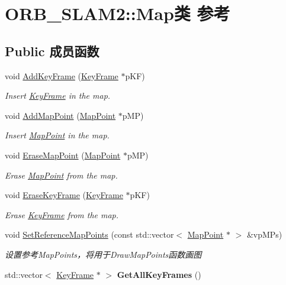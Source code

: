 \hypertarget{classORB__SLAM2_1_1Map}{\section{O\-R\-B\-\_\-\-S\-L\-A\-M2\-:\-:Map类 参考}
\label{classORB__SLAM2_1_1Map}
}
\subsection*{Public 成员函数}
\begin{DoxyCompactItemize}
\item 
void \hyperlink{classORB__SLAM2_1_1Map_a688de3b072e0176bb288bb70d36cd0e9}{Add\-Key\-Frame} (\hyperlink{classORB__SLAM2_1_1KeyFrame}{Key\-Frame} $\ast$p\-K\-F)
\begin{DoxyCompactList}\small\item\em Insert \hyperlink{classORB__SLAM2_1_1KeyFrame}{Key\-Frame} in the map. \end{DoxyCompactList}\item 
void \hyperlink{classORB__SLAM2_1_1Map_a2d8e1b4376778dfe32df90ec00b599e3}{Add\-Map\-Point} (\hyperlink{classORB__SLAM2_1_1MapPoint}{Map\-Point} $\ast$p\-M\-P)
\begin{DoxyCompactList}\small\item\em Insert \hyperlink{classORB__SLAM2_1_1MapPoint}{Map\-Point} in the map. \end{DoxyCompactList}\item 
void \hyperlink{classORB__SLAM2_1_1Map_af3c82d5e66815fe66cbfb736784f15b5}{Erase\-Map\-Point} (\hyperlink{classORB__SLAM2_1_1MapPoint}{Map\-Point} $\ast$p\-M\-P)
\begin{DoxyCompactList}\small\item\em Erase \hyperlink{classORB__SLAM2_1_1MapPoint}{Map\-Point} from the map. \end{DoxyCompactList}\item 
void \hyperlink{classORB__SLAM2_1_1Map_a082d4a5ec57a48a7591d6769e4778a80}{Erase\-Key\-Frame} (\hyperlink{classORB__SLAM2_1_1KeyFrame}{Key\-Frame} $\ast$p\-K\-F)
\begin{DoxyCompactList}\small\item\em Erase \hyperlink{classORB__SLAM2_1_1KeyFrame}{Key\-Frame} from the map. \end{DoxyCompactList}\item 
void \hyperlink{classORB__SLAM2_1_1Map_a90aeb2ade0c536688bd42728457e9483}{Set\-Reference\-Map\-Points} (const std\-::vector$<$ \hyperlink{classORB__SLAM2_1_1MapPoint}{Map\-Point} $\ast$ $>$ \&vp\-M\-Ps)
\begin{DoxyCompactList}\small\item\em 设置参考\-Map\-Points，将用于\-Draw\-Map\-Points函数画图 \end{DoxyCompactList}\item 
\hypertarget{classORB__SLAM2_1_1Map_a8cde12cda887a0eb1e24975f4e734592}{std\-::vector$<$ \hyperlink{classORB__SLAM2_1_1KeyFrame}{Key\-Frame} $\ast$ $>$ {\bfseries Get\-All\-Key\-Frames} ()}\label{classORB__SLAM2_1_1Map_a8cde12cda887a0eb1e24975f4e734592}


\end{DoxyCompactItemize}
